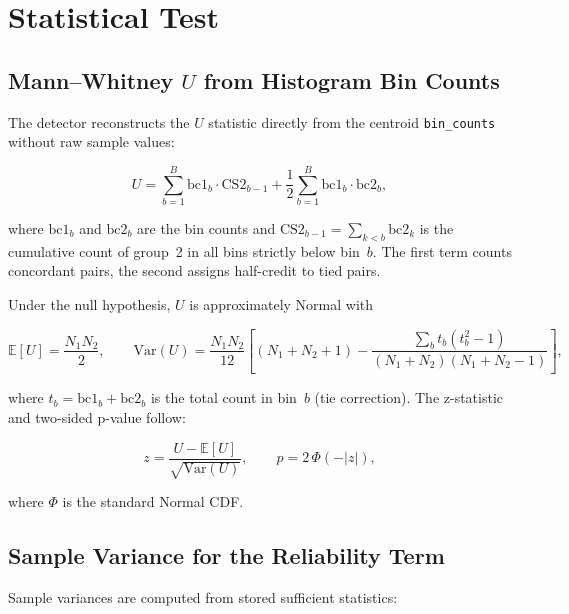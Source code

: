 \documentclass[11pt]{article}
\begin{document}
\section{Statistical Test}

\subsection{Mann--Whitney $U$ from Histogram Bin Counts}
\label{sec:mannwhitney}

The detector reconstructs the $U$ statistic directly from the centroid
\texttt{bin\_counts} without raw sample values:

\begin{equation}
  U = \sum_{b=1}^{B} \mathrm{bc1}_b \cdot \mathrm{CS2}_{b-1}
      + \frac{1}{2}\sum_{b=1}^{B} \mathrm{bc1}_b \cdot \mathrm{bc2}_b,
\end{equation}

where \(\mathrm{bc1}_b\) and \(\mathrm{bc2}_b\) are the bin counts and
\(\mathrm{CS2}_{b-1} = \sum_{k<b}\mathrm{bc2}_k\) is the cumulative count of
group~2 in all bins strictly below bin~$b$.  The first term counts
concordant pairs, the second assigns half-credit to tied pairs.

Under the null hypothesis, $U$ is approximately Normal with

\begin{equation}
  \mathbb{E}[U] = \frac{N_1 N_2}{2}, \qquad
  \mathrm{Var}(U) = \frac{N_1 N_2}{12}
    \left[(N_1+N_2+1) - \frac{\sum_b t_b(t_b^2-1)}{(N_1+N_2)(N_1+N_2-1)}\right],
\end{equation}

where \(t_b = \mathrm{bc1}_b + \mathrm{bc2}_b\) is the total count in bin~$b$
(tie correction).  The z-statistic and two-sided p-value follow:

\begin{equation}
  z = \frac{U - \mathbb{E}[U]}{\sqrt{\mathrm{Var}(U)}},
  \qquad p = 2\,\Phi(-|z|),
\end{equation}

where $\Phi$ is the standard Normal CDF.

\subsection{Sample Variance for the Reliability Term}

Sample variances are computed from stored sufficient statistics:
\end{document}

